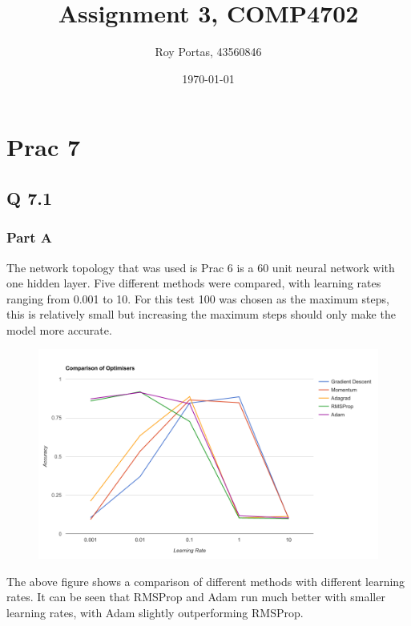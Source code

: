 
\usepackage{mathtools}
\usepackage{url}

\title{Assignment 3, COMP4702}
\author{Roy Portas, 43560846}
\date{\today}

 
\begin{titlepage}
    \maketitle
\end{titlepage}

\section*{Prac 7}

\subsection*{Q 7.1}

\subsubsection*{Part A}

The network topology that was used is Prac 6 is a 60 unit neural network with one hidden layer.
Five different methods were compared, with learning rates ranging from 0.001 to 10.
For this test 100 was chosen as the maximum steps, 
this is relatively small but increasing the maximum steps should only make the model more accurate.

\begin{figure}[H]
	\centering
	\includegraphics[width=\linewidth]{images/q7_optimisers}
\end{figure}

The above figure shows a comparison of different methods with different learning rates.
It can be seen that RMSProp and Adam run much better with smaller learning rates, with Adam slightly outperforming RMSProp.

